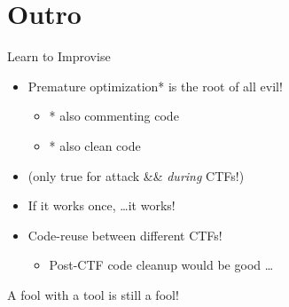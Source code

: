 
%


\section{Outro}

\begin{frame}
  {Learn to Improvise}

  \begin{itemize}
    \item Premature optimization* is the root of all evil!
      \begin{itemize}
        \item * also commenting code
        \item * also clean code
      \end{itemize}
    \item (only true for attack \&\&  \emph{during} CTFs!)
    \item If it works once, \ldots it works!
    \item Code-reuse between different CTFs!
      \begin{itemize}
        \item Post-CTF code cleanup would be good \ldots
      \end{itemize}
  \end{itemize}

\end{frame}

\begin{frame}[plain]
	\begin{center}
		\huge A fool with a tool is still a fool!
	\end{center}
\end{frame}


